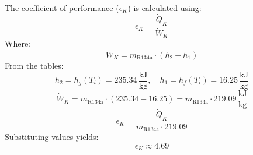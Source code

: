 The coefficient of performance (\(\epsilon_K\)) is calculated using:  
\[
\epsilon_K = \frac{\dot{Q}_K}{\dot{W}_K}
\]  
Where:  
\[
\dot{W}_K = \dot{m}_{\text{R134a}} \cdot (h_2 - h_1)
\]  
From the tables:  
\[
h_2 = h_g(T_i) = 235.34 \, \frac{\text{kJ}}{\text{kg}}, \quad h_1 = h_f(T_i) = 16.25 \, \frac{\text{kJ}}{\text{kg}}
\]  
\[
\dot{W}_K = \dot{m}_{\text{R134a}} \cdot (235.34 - 16.25) = \dot{m}_{\text{R134a}} \cdot 219.09 \, \frac{\text{kJ}}{\text{kg}}
\]  
\[
\epsilon_K = \frac{\dot{Q}_K}{\dot{m}_{\text{R134a}} \cdot 219.09}
\]  
Substituting values yields:  
\[
\epsilon_K \approx 4.69
\]
